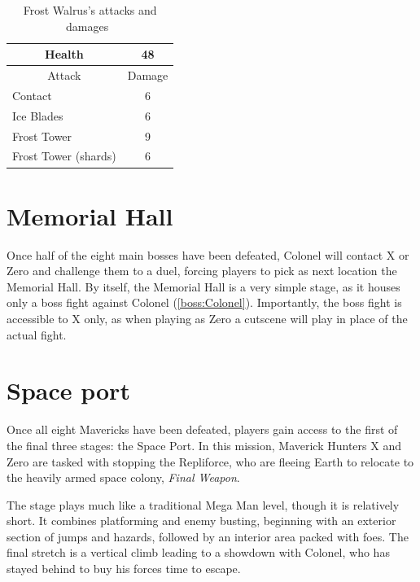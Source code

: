 \begin{table}[htp]
	\centering
	\begin{tabular}[h]{l c}
		\toprule
		\multicolumn{1}{c}{Health}  & 48\\
		\midrule
		\multicolumn{1}{c}{Attack} & \multicolumn{1}{c}{Damage}\\
		Contact & 6 \\
		Ice Blades & 6 \\
		Frost Tower & 9\\
		Frost Tower (shards) & 6\\
		\bottomrule
	\end{tabular}
	\caption{Frost Walrus's attacks and damages~\cite{book:Compendium,wiki:Frost_walrus}}
\end{table}

\section{Memorial Hall}
Once half of the eight main bosses have been defeated, Colonel will contact X or Zero and challenge them to a duel, forcing players to pick as next location the Memorial Hall. By itself, the Memorial Hall is a very simple stage, as it houses only a boss fight against Colonel (\ref{boss:Colonel}). Importantly, the boss fight is accessible to X only, as when playing as Zero a cutscene will play in place of the actual fight.

\section{Space port}
Once all eight Mavericks have been defeated, players gain access to the first of the final three stages: the Space Port. In this mission, Maverick Hunters X and Zero are tasked with stopping the Repliforce, who are fleeing Earth to relocate to the heavily armed space colony, \emph{Final Weapon}.

The stage plays much like a traditional Mega Man level, though it is relatively short. It combines platforming and enemy busting, beginning with an exterior section of jumps and hazards, followed by an interior area packed with foes. The final stretch is a vertical climb leading to a showdown with Colonel, who has stayed behind to buy his forces time to escape.


